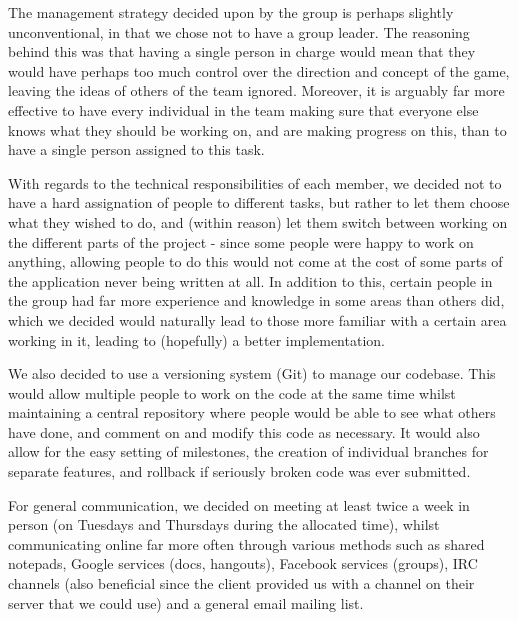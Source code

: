 \documentclass[a4paper,10pt,twoside]{article}
\begin{document}
The management strategy decided upon by the group is perhaps slightly unconventional, in that we chose not to have a group leader. The reasoning behind this was that having a single person in charge would mean that they would have perhaps too much control over the direction and concept of the game, leaving the ideas of others of the team ignored. Moreover, it is arguably far more effective to have every individual in the team making sure that everyone else knows what they should be working on, and are making progress on this, than to have a single person assigned to this task.

With regards to the technical responsibilities of each member, we decided not to have a hard assignation of people to different tasks, but rather to let them choose what they wished to do, and (within reason) let them switch between working on the different parts of the project - since some people were happy to work on anything, allowing people to do this would not come at the cost of some parts of the application never being written at all. In addition to this, certain people in the group had far more experience and knowledge in some areas than others did, which we decided would naturally lead to those more familiar with a certain area working in it, leading to (hopefully) a better implementation.

We also decided to use a versioning system (Git) to manage our codebase. This would allow multiple people to work on the code at the same time whilst maintaining a central repository where people would be able to see what others have done, and comment on and modify this code as necessary. It would also allow for the easy setting of milestones, the creation of individual branches for separate features, and rollback if seriously broken code was ever submitted.

For general communication, we decided on meeting at least twice a week in person (on Tuesdays and Thursdays during the allocated time), whilst communicating online far more often through various methods such as shared notepads, Google services (docs, hangouts), Facebook services (groups), IRC channels (also beneficial since the client provided us with a channel on their server that we could use) and a general email mailing list. 
\end{document}
